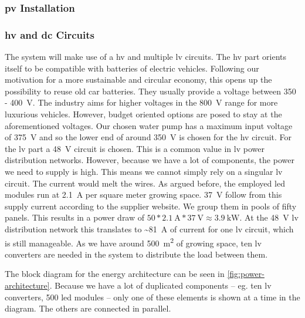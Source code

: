 \subsubsection{\ac{pv} Installation}

\subsubsection{\ac{hv} and \ac{dc} Circuits}
The system will make use of a \ac{hv} and multiple \ac{lv} circuits.
The \ac{hv} part orients itself to be  compatible with batteries of electric vehicles.
Following our motivation for a more sustainable and circular economy, this opens up the possibility to reuse old car batteries.
They usually provide a voltage between 350 - \SI{400}{\V}.
The industry aims for higher voltages in the \SI{800}{\V} range for more luxurious vehicles.
However, budget oriented options are posed to stay at the aforementioned voltages.
Our chosen water pump has a maximum input voltage of \SI{375}{\V} and so the lower end of around \SI{350}{\V} is chosen for the \ac{hv} circuit.
For the \ac{lv} part a \SI{48}{\V} circuit is chosen.
This is a common value in \ac{lv} power distribution networks.
However, because we have a lot of components, the power we need to supply is high.
This means we cannot simply rely on a singular \ac{lv} circuit.
The current would melt the wires.
As argued before, the employed \ac{led} modules run at \SI{2.1}{\A} per square meter growing space.
\SI{37}{\V} follow from this supply current according to the supplier website.
We group them in pools of fifty panels.
This results in a power draw of $50 * \SI{2.1}{\A} * \SI{37}{\V} \approx \SI{3.9}{\kW}$.
At the \SI{48}{\V} \ac{lv} distribution network this translates to \textasciitilde\SI{81}{\A} of current for one \ac{lv} circuit, which is still manageable.
As we have around \SI{500}{\square\m} of growing space, ten \ac{lv} converters are needed in the system to distribute the load between them.

The block diagram for the energy architecture can be seen in \ref{fig:power-architecture}.
Because we have a lot of duplicated components -- eg. ten \ac{lv} converters, 500 \ac{led} modules -- only one of these elements is shown at a time in the diagram.
The others are connected in parallel.

